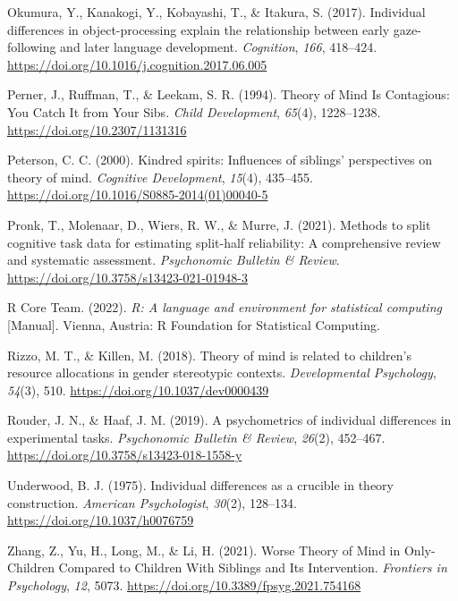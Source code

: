\documentclass[
  man,floatsintext]{apa6}
\newlength{\cslhangindent}
\newlength{\cslentryspacingunit} %
\newenvironment{CSLReferences}[2] %
 {%
  \setlength{\parindent}{0pt}
  \ifodd #1
  \let\oldpar\par
  \def\par{\hangindent=\cslhangindent\oldpar}
  \fi
  \setlength{\parskip}{#2\cslentryspacingunit}
 }%
 {}
\begin{document}
\begin{CSLReferences}{1}{0}
\leavevmode{}%
Okumura, Y., Kanakogi, Y., Kobayashi, T., \& Itakura, S. (2017). Individual differences in object-processing explain the relationship between early gaze-following and later language development. \emph{Cognition}, \emph{166}, 418--424. \url{https://doi.org/10.1016/j.cognition.2017.06.005}

\leavevmode{}%
Perner, J., Ruffman, T., \& Leekam, S. R. (1994). Theory of {Mind Is Contagious}: {You Catch It} from {Your Sibs}. \emph{Child Development}, \emph{65}(4), 1228--1238. \url{https://doi.org/10.2307/1131316}

\leavevmode{}%
Peterson, C. C. (2000). Kindred spirits: {Influences} of siblings' perspectives on theory of mind. \emph{Cognitive Development}, \emph{15}(4), 435--455. \url{https://doi.org/10.1016/S0885-2014(01)00040-5}

\leavevmode{}%
Pronk, T., Molenaar, D., Wiers, R. W., \& Murre, J. (2021). Methods to split cognitive task data for estimating split-half reliability: {A} comprehensive review and systematic assessment. \emph{Psychonomic Bulletin \& Review}. \url{https://doi.org/10.3758/s13423-021-01948-3}

\leavevmode{}%
R Core Team. (2022). \emph{R: {A} language and environment for statistical computing} {[}Manual{]}. {Vienna, Austria}: {R Foundation for Statistical Computing}.

\leavevmode{}%
Rizzo, M. T., \& Killen, M. (2018). Theory of mind is related to children's resource allocations in gender stereotypic contexts. \emph{Developmental Psychology}, \emph{54}(3), 510. \url{https://doi.org/10.1037/dev0000439}

\leavevmode{}%
Rouder, J. N., \& Haaf, J. M. (2019). A psychometrics of individual differences in experimental tasks. \emph{Psychonomic Bulletin \& Review}, \emph{26}(2), 452--467. \url{https://doi.org/10.3758/s13423-018-1558-y}

\leavevmode{}%
Underwood, B. J. (1975). Individual differences as a crucible in theory construction. \emph{American Psychologist}, \emph{30}(2), 128--134. \url{https://doi.org/10.1037/h0076759}

\leavevmode{}%
Zhang, Z., Yu, H., Long, M., \& Li, H. (2021). Worse {Theory} of {Mind} in {Only-Children Compared} to {Children With Siblings} and {Its Intervention}. \emph{Frontiers in Psychology}, \emph{12}, 5073. \url{https://doi.org/10.3389/fpsyg.2021.754168}

\end{CSLReferences}
\end{document}
